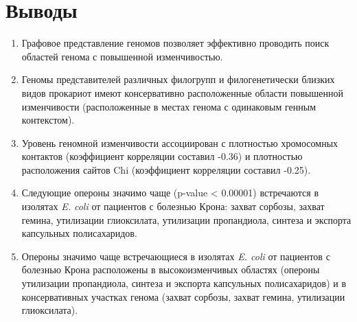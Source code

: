 \section*{Выводы} 
\begin{enumerate}
  \item Графовое представление геномов позволяет эффективно проводить поиск областей генома с повышенной изменчивостью.

	\item Геномы представителей различных филогрупп и филогенетически близких видов прокариот имеют консервативно расположенные области повышенной изменчивости (расположенные в местах генома с одинаковым генным контекстом).

 	\item Уровень геномной изменчивости ассоциирован с плотностью хромосомных контактов (коэффициент корреляции составил -0.36) и плотностью расположения сайтов Chi (коэффициент корреляции составил -0.25).

	\item Следующие опероны значимо чаще (p-value < 0.00001) встречаются в изолятах \textit{E. coli} от пациентов с болезнью Крона: захват сорбозы, захват гемина, утилизации глиоксилата, утилизации пропандиола, синтеза и экспорта капсульных полисахаридов.

    \item Опероны значимо чаще встречающиеся в изолятах \textit{E. coli} от пациентов с болезнью Крона расположены в высокоизменчивых областях (опероны утилизации пропандиола, синтеза и экспорта капсульных полисахаридов) и в консервативных участках генома (захват сорбозы, захват гемина, утилизации глиоксилата).\end{enumerate}



